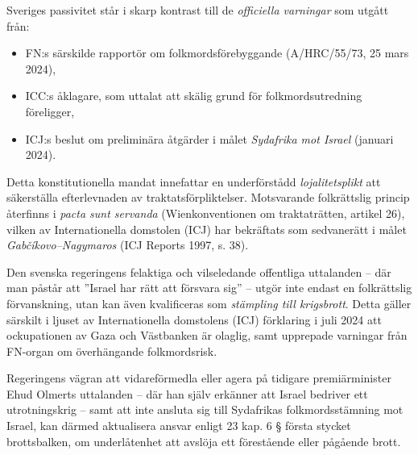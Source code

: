 \noindent
Sveriges passivitet står i skarp kontrast till de \textit{officiella varningar} som utgått från:

\begin{itemize}
    \item FN:s särskilde rapportör om folkmordsförebyggande (A/HRC/55/73, 25 mars 2024),
    \item ICC:s åklagare, som uttalat att skälig grund för folkmordsutredning föreligger,
    \item ICJ:s beslut om preliminära åtgärder i målet \textit{Sydafrika mot Israel} (januari 2024).
\end{itemize}

\medskip


\noindent
Detta konstitutionella mandat innefattar en underförstådd \textit{lojalitetsplikt} att säkerställa efterlevnaden av traktatsförpliktelser. Motsvarande folkrättslig princip återfinns i \textit{pacta sunt servanda} (Wienkonventionen om traktaträtten, artikel 26), vilken av Internationella domstolen (ICJ) har bekräftats som sedvanerätt i målet \textit{Gabčíkovo–Nagymaros} (ICJ Reports 1997, s. 38).

\medskip


\noindent
Den svenska regeringens felaktiga och vilseledande offentliga uttalanden – där man påstår att ”Israel har rätt att försvara sig” – utgör inte endast en folkrättslig förvanskning, utan kan även kvalificeras som \textit{stämpling till krigsbrott}. Detta gäller särskilt i ljuset av Internationella domstolens (ICJ) förklaring i juli 2024 att ockupationen av Gaza och Västbanken är olaglig, samt upprepade varningar från FN-organ om överhängande folkmordsrisk.

\noindent
Regeringens vägran att vidareförmedla eller agera på tidigare premiärminister Ehud Olmerts uttalanden – där han själv erkänner att Israel bedriver ett utrotningskrig – samt att inte ansluta sig till Sydafrikas folkmordsstämning mot Israel, kan därmed aktualisera ansvar enligt 23 kap. 6 § första stycket brottsbalken, om underlåtenhet att avslöja ett förestående eller pågående brott.


